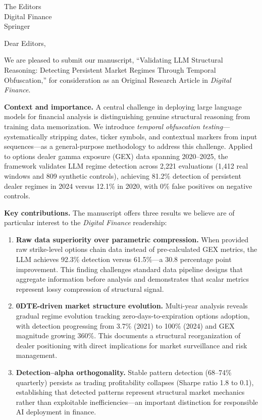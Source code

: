 \documentclass[11pt]{letter}
\begin{document}
\begin{letter}{The Editors \\ Digital Finance \\ Springer}

\opening{Dear Editors,}

We are pleased to submit our manuscript, ``Validating LLM Structural Reasoning: Detecting Persistent Market Regimes Through Temporal Obfuscation,'' for consideration as an Original Research Article in \textit{Digital Finance}.

\textbf{Context and importance.}
A central challenge in deploying large language models for financial analysis is distinguishing genuine structural reasoning from training data memorization. We introduce \textit{temporal obfuscation testing}---systematically stripping dates, ticker symbols, and contextual markers from input sequences---as a general-purpose methodology to address this challenge. Applied to options dealer gamma exposure (GEX) data spanning 2020--2025, the framework validates LLM regime detection across 2,221 evaluations (1,412 real windows and 809 synthetic controls), achieving 81.2\% detection of persistent dealer regimes in 2024 versus 12.1\% in 2020, with 0\% false positives on negative controls.

\textbf{Key contributions.}
The manuscript offers three results we believe are of particular interest to the \textit{Digital Finance} readership:

\begin{enumerate}
\item \textbf{Raw data superiority over parametric compression.} When provided raw strike-level options chain data instead of pre-calculated GEX metrics, the LLM achieves 92.3\% detection versus 61.5\%---a 30.8 percentage point improvement. This finding challenges standard data pipeline designs that aggregate information before analysis and demonstrates that scalar metrics represent lossy compression of structural signal.

\item \textbf{0DTE-driven market structure evolution.} Multi-year analysis reveals gradual regime evolution tracking zero-days-to-expiration options adoption, with detection progressing from 3.7\% (2021) to 100\% (2024) and GEX magnitude growing 360\%. This documents a structural reorganization of dealer positioning with direct implications for market surveillance and risk management.

\item \textbf{Detection--alpha orthogonality.} Stable pattern detection (68--74\% quarterly) persists as trading profitability collapses (Sharpe ratio 1.8 to 0.1), establishing that detected patterns represent structural market mechanics rather than exploitable inefficiencies---an important distinction for responsible AI deployment in finance.
\end{enumerate}


\end{letter}
\end{document}
